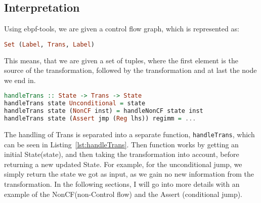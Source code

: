 \subsection{Interpretation}
Using ebpf-tools, we are given a control flow graph, which is represented as:
\begin{lstlisting}[language={haskell}, numbers=none]
  Set (Label, Trans, Label)
\end{lstlisting}
This means, that we are given a set of tuples, where the first element is the
source of the transformation, followed by the transformation and at last the
node we end in. 
\begin{lstlisting}[language={haskell}, caption={The handleTrans functnion}, label={lst:handleTrans}]
handleTrans :: State -> Trans -> State
handleTrans state Unconditional = state
handleTrans state (NonCF inst) = handleNonCF state inst
handleTrans state (Assert jmp (Reg lhs)) regimm = ...
\end{lstlisting}
The handling of Trans is separated into a separate function,
\texttt{handleTrans}, which can be seen in Listing~\ref{lst:handleTrans}. Then
function works by getting an initial State(state), and then taking the
transformation into account, before returning a new updated State. For example,
for the unconditional jump, we simply return the state we got as input, as we
gain no new information from the transformation. In the following sections, I
will go into more details with an example of the NonCF(non-Control flow) and
the Assert (conditional jump).


